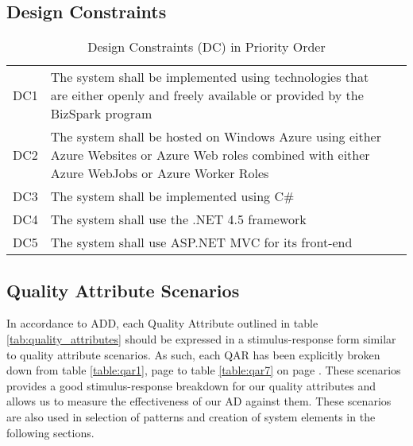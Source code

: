 \subsection{Design Constraints}
\begin{table}[!h]
\centering
\begin{tabularx}{\linewidth}{|l|X|l}
\cline{1-2}
DC1 & The system shall be implemented using technologies that are either openly and freely available or provided by the BizSpark program &   \\
DC2 & The system shall be hosted on Windows Azure using either Azure Websites or Azure Web roles combined with either Azure WebJobs or Azure Worker Roles &  \\
DC3 & The system shall be implemented using C\# &    \\
DC4 & The system  shall use the .NET 4.5 framework    \\
DC5 & The system shall use ASP.NET MVC for its front-end &    \\
\cline{1-2}
\end{tabularx}
\caption{Design Constraints (DC) in Priority Order}
\label{tab:design_constraints}
\end{table}

\subsection{Quality Attribute Scenarios}
In accordance to ADD, each Quality Attribute outlined in table \ref{tab:quality_attributes} should be expressed in a stimulus-response form similar to quality attribute scenarios. As such, each QAR has been explicitly broken down from table \ref{table:qar1}, page \pageref{table:qar1} to table \ref{table:qar7} on page \pageref{table:qar7}. These scenarios provides a good stimulus-response breakdown for our quality attributes and allows us to measure the effectiveness of our AD against them. These scenarios are also used in selection of patterns and creation of system elements in the following sections. 

